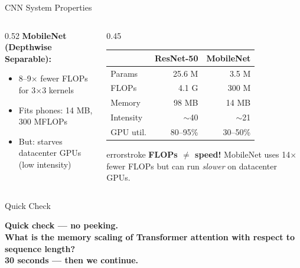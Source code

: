 \documentclass[aspectratio=169, 12pt]{beamer}
\begin{document}
\begin{frame}{CNN System Properties}
\begin{columns}[T]
\begin{column}{0.52\textwidth}
    \vspace{0.1cm}
    \textbf{MobileNet (Depthwise Separable):}
    \begin{itemize}\setlength\itemsep{0pt}
      \item 8--9$\times$ fewer FLOPs for 3$\times$3 kernels
      \item Fits phones: 14 MB, 300 MFLOPs
      \item But: \alert{starves datacenter GPUs} (low intensity)
    \end{itemize}
  \end{column}
  \begin{column}{0.45\textwidth}
    \renewcommand{\arraystretch}{1.1}
    {\scriptsize
    \begin{tabular}{@{}lrr@{}}
      \toprule
      & \textbf{ResNet-50} & \textbf{MobileNet} \\
      \midrule
      Params     & 25.6 M & 3.5 M \\
      FLOPs      & 4.1 G  & 300 M \\
      Memory     & 98 MB  & 14 MB \\
      Intensity  & $\sim$40  & $\sim$21 \\
      GPU util.  & 80--95\% & 30--50\% \\
      \bottomrule
    \end{tabular}
    }

    \vspace{0.1cm}
    \begin{mlsyscard}{errorstroke}
    {\scriptsize \textbf{FLOPs $\neq$ speed!} MobileNet uses 14$\times$ fewer FLOPs but can run \emph{slower} on datacenter GPUs.}
    \end{mlsyscard}
  \end{column}
\end{columns}

\end{frame}

\begin{frame}{Quick Check}

\centering
\Large\bfseries Quick check --- no peeking.\\[0.5cm]
\normalsize What is the memory scaling of Transformer attention with respect to sequence length?\\[0.3cm]
{\small 30 seconds --- then we continue.}
\end{frame}
\end{document}
